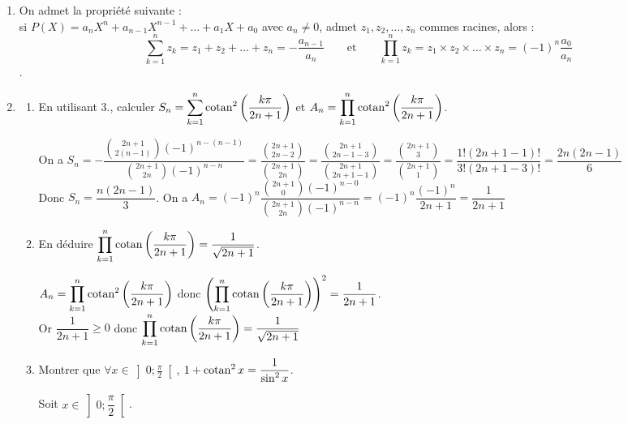 \documentclass[a4paper,french,bookmarks]{article}
\def\cotan{\qopname\relax o{cotan}}
\begin{document}
\begin{enumerate}
    \item On admet la propriété suivante :\\
    si $P(X) = a_nX^n + a_{n-1}X^{n-1} + \dots + a_1X + a_0$ avec $a_n \neq 0$, admet $z_1, z_2, \dots, z_n$ commes racines, alors :
    \[\sum_{k=1}^n z_k = z_1 + z_2 + \dots + z_n = -\frac{a_{n-1}}{a_n} \qquad \text{et} \qquad \prod_{k=1}^n z_k = z_1 \times z_2 \times \dots \times z_n = (-1)^n\frac{a_0}{a_n}\].
    \item \begin{enumerate}
        \item En utilisant 3., calculer $\displaystyle S_n = \sum_{k=1}^n\cotan^2\left(\dfrac{k\pi}{2n+1}\right)$ et $\displaystyle A_n = \prod_{k=1}^n\cotan^2\left(\dfrac{k\pi}{2n+1}\right)$.
        \begin{tcolorbox}[colback=black!8,colframe=black!9,boxrule=.25pt,enhanced,arc is angular,arc=0pt]
        On a $S_n=-\dfrac{\binom{2n+1}{2(n-1)}(-1)^{n-(n-1)}}{\binom{2n+1}{2n}(-1)^{n-n}} =  \dfrac{\binom{2n+1}{2n-2}}{\binom{2n+1}{2n}}=\dfrac{\binom{2n+1}{2n-1-3}}{\binom{2n+1}{2n+1-1}}=\dfrac{\binom{2n+1}{3}}{\binom{2n+1}{1}}=\dfrac{1!(2n+1-1)!}{3!(2n+1-3)!}=\dfrac{2n(2n-1)}{6}$\\
        Donc $S_n = \dfrac{n(2n-1)}{3}$. \qquad\qquad
        On a $A_n = (-1)^n\dfrac{\binom{2n+1}{0}(-1)^{n-0}}{\binom{2n+1}{2n}(-1)^{n-n}}=(-1)^n\dfrac{(-1)^n}{2n+1}=\dfrac{1}{2n+1}$
        \end{tcolorbox}
    \item En déduire $\displaystyle \prod_{k=1}^n\cotan\left(\dfrac{k\pi}{2n+1}\right) = \dfrac{1}{\sqrt{2n+1}}$.
            \begin{tcolorbox}[colback=black!8,colframe=black!9,boxrule=.25pt,enhanced,arc is angular,arc=0pt]
            $\displaystyle A_n = \prod_{k=1}^n\cotan^2\left(\dfrac{k\pi}{2n+1}\right)$ donc $\displaystyle\left(\prod_{k=1}^n\cotan\left(\dfrac{k\pi}{2n+1}\right)\right)^2 = \dfrac{1}{2n+1}$.\\
            Or $\dfrac{1}{2n+1} \geq 0$ donc
            $\displaystyle \prod_{k=1}^n\cotan\left(\dfrac{k\pi}{2n+1}\right) = \dfrac{1}{\sqrt{2n+1}}$
            \end{tcolorbox}
    \item Montrer que $\forall x \in \left]0;\frac{\pi}{2}\right[$, \quad $1 + \cotan^2 x = \dfrac{1}{\sin^2 x}$.
    \begin{tcolorbox}[colback=black!8,colframe=black!9,boxrule=.25pt,enhanced,arc is angular,arc=0pt]
    Soit $x \in \left]0;\dfrac{\pi}{2}\right[$. \qquad\qquad

\end{tcolorbox}
\end{enumerate}
\end{enumerate}
\end{document}
